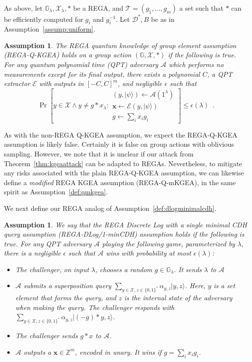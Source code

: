 \documentclass{article}\usepackage[a4paper,margin=20mm]{geometry}
\newtheorem{assumption}[theorem]{Assumption}
\numberwithin{theorem}{section}
\numberwithin{equation}{section}
\newcommand{\Z}{\mathbb{Z}}
\newcommand{\G}{\mathbb{G}}
\newcommand{\xv}{{\mathbf{x}}}
\newcommand{\As}{{\mathcal{A}}}
\newcommand{\Ds}{{\mathcal{D}}}
\newcommand{\Es}{{\mathcal{E}}}
\newcommand{\Ts}{{\mathcal{T}}}
\newcommand{\Xs}{{\mathcal{X}}}
\begin{document}
As above, let $\G_\lambda,\Xs_\lambda,*$ be a REGA, and $\Ts=(g_1,\dots,g_m)$ a set such that $*$ can be efficiently computed for $g_i$ and $g_i^{-1}$. Let $\Ds^*,B$ be as in Assumption~\ref{assump:uniform}.

\begin{assumption}\label{def:REGAqkgea} The \emph{REGA quantum knowledge of group element assumption} (REGA-Q-KGEA) holds on a group action $(\G,\Xs,*)$ if the following is true. For any quantum polynomial time (QPT) adversary $\As$ which performs no measurements except for its final output, there exists a polynomial $C$, a QPT extractor $\Es$ with outputs in $[-C,C]^m$, and negligible $\epsilon$ such that 
	\[\Pr\left[y\in\Xs\wedge y\neq g*x_\lambda:\substack{(y,|\psi\rangle)\gets\As(1^\lambda)\\\xv\gets\Es(y,|\psi\rangle)\\g\gets\sum_i x_i g_i}\right]\leq\epsilon(\lambda)\enspace .\]
\end{assumption}

As with the non-REGA Q-KGEA assumption, we expect the REGA-Q-KGEA assumption is likely false. Certainly it is false on group actions with oblivious sampling. However, we note that it is unclear if our attack from Theorem~\ref{thm:kgeaattack} can be adapted to REGAs. Nevertheless, to mitigate any risks associated with the plain REGA-Q-KGEA assumption, we can likewise define a \emph{modified} REGA KGEA assumption (REGA-Q-mKGEA), in the same spirit as Assumption~\ref{def:qmkgea}.

We next define our REGA analog of Assumption~\ref{def:dlogminimalcdh}.

\begin{assumption}\label{def:REGAdlogminimalcdh} We say that the \emph{REGA Discrete Log with a single minimal CDH query} assumption (REGA-DLog/1-minCDH) assumption holds if the following is true. For any QPT adversary $\As$ playing the following game, parameterized by $\lambda$, there is a negligible $\epsilon$ such that $\As$ wins with probability at most $\epsilon(\lambda)$:
	\begin{itemize}
		\item The challenger, on input $\lambda$, chooses a random $g\in\G_\lambda$. It sends $\lambda$ to $\As$
		\item $\As$ submits a superposition query $\sum_{y\in\Xs,z\in\{0,1\}^*}\alpha_{y,z}|y,z\rangle$. Here, $y$ is a set element that forms the query, and $z$ is the internal state of the adversary when making the query. The challenger responds with $\sum_{y\in\Xs,z\in\{0,1\}^*}\alpha_{y,z}|(-g)*y,z\rangle$. 
		\item The challenger sends $g*x$ to $\As$.
		\item $\As$ outputs a $\xv\in\Z^m$, encoded in unary. It wins if $g=\sum_i x_i g_i$.
	\end{itemize}
\end{assumption}
\end{document}
